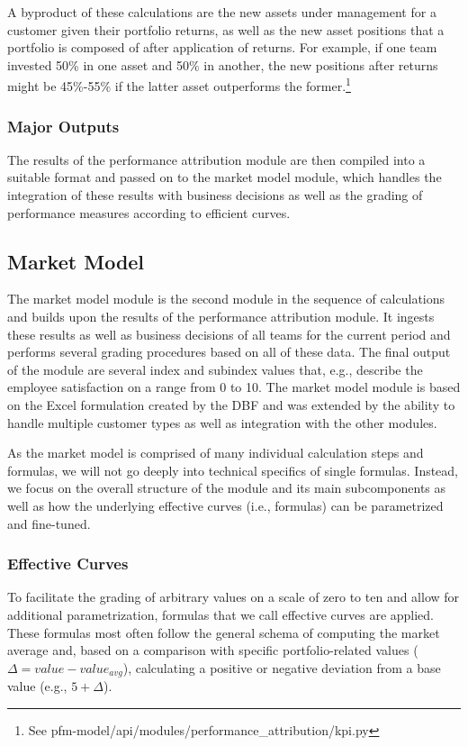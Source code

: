 A byproduct of these calculations are the new assets under management for a customer given their portfolio returns, as well as the new asset positions that a portfolio is composed of after application of returns. For example, if one team invested 50\% in one asset and 50\% in another, the new positions after returns might be 45\%-55\% if the latter asset outperforms the former.\footnote{See pfm-model/api/modules/performance\_attribution/kpi.py}

\subsubsection{Major Outputs}
The results of the performance attribution module are then compiled into a suitable format and passed on to the market model module, which handles the integration of these results with business decisions as well as the grading of performance measures according to efficient curves.


\subsection{Market Model}
The market model module is the second module in the sequence of calculations and builds upon the results of the performance attribution module. It ingests these results as well as business decisions of all teams for the current period and performs several grading procedures based on all of these data. The final output of the module are several index and subindex values that, e.g., describe the employee satisfaction on a range from 0 to 10. The market model module is based on the Excel formulation created by the DBF and was extended by the ability to handle multiple customer types as well as integration with the other modules.

As the market model is comprised of many individual calculation steps and formulas, we will not go deeply into technical specifics of single formulas. Instead, we focus on the overall structure of the module and its main subcomponents as well as how the underlying effective curves (i.e., formulas) can be parametrized and fine-tuned.

\subsubsection{Effective Curves}
To facilitate the grading of arbitrary values on a scale of zero to ten and allow for additional parametrization, formulas that we call effective curves are applied. These formulas most often follow the general schema of computing the market average and, based on a comparison with specific portfolio-related values (\(\Delta = value - value_{avg}\)), calculating a positive or negative deviation from a base value (e.g., \(5 + \Delta \)).

